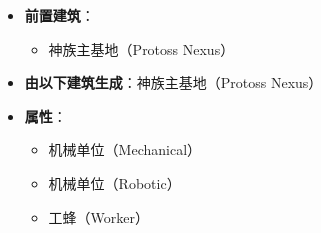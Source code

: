 \begin{tcolorbox}[colback=white, colframe=black!60!white, title=Protoss\_Probe(), arc=0mm]
\begin{itemize}
\begin{itemize}
            \end{itemize}
        \item \textbf{前置建筑}：
            \begin{itemize}
                \item 神族主基地（Protoss Nexus）
            \end{itemize}
        \item \textbf{由以下建筑生成}：神族主基地（Protoss Nexus）
        \item \textbf{属性}：
            \begin{itemize}
                \item 机械单位（Mechanical）
                \item 机械单位（Robotic）
                \item 工蜂（Worker）
            \end{itemize}
    \end{itemize}
\end{tcolorbox}

